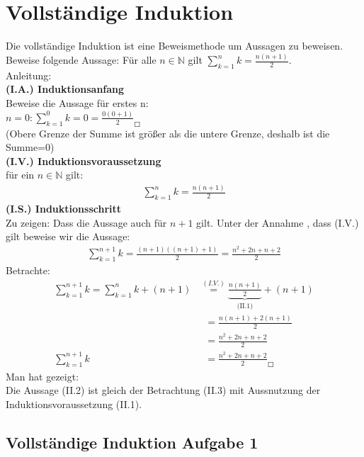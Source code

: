 \section{Vollständige Induktion}

Die vollständige Induktion ist eine Beweismethode um Aussagen zu beweisen.\\
Beweise folgende Aussage: Für alle $ n\in\mathbb{N} $ gilt $ \sum\limits_{k=1}^{n}k=\frac{n(n+1)}{2} $.\\
Anleitung:\\
\textbf{(I.A.) Induktionsanfang}\\
Beweise die Aussage für erstes n:\\
$ n=0:\sum\limits_{k=1}^{0}k=0=\frac{0(0+1)}{2}_{\Square} $\\
(Obere Grenze der Summe ist größer als die untere Grenze, deshalb ist die Summe=0)\\
\textbf{(I.V.) Induktionsvoraussetzung}\\
für ein $ n\in \mathbb{N} $ gilt:\\
\begin{align}
	\sum\limits_{k=1}^{n}k=\frac{n(n+1)}{2}
\end{align}
\textbf{(I.S.) Induktionsschritt}\\
Zu zeigen: Dass die Aussage auch für $ n+1 $ gilt. Unter der Annahme , dass (I.V.) gilt beweise wir die Aussage:\\
\begin{align}
	\sum\limits_{k=1}^{n+1}k=\frac{(n+1)((n+1)+1)}{2}=\frac{n^2+2n+n+2}{2}
\end{align}
Betrachte:\\
\begin{align}
	\sum\limits_{k=1}^{n+1}k=\sum\limits_{k=1}^{n}k+(n+1)&\overset{(I.V.)}{=}\underbrace{\frac{n(n+1)}{2}}_{\text{(II.1)}}+(n+1)\nonumber\\
	&\;\;=\frac{n(n+1)+2(n+1)}{2}\nonumber\\
	&\;\;=\frac{n^2+2n+n+2}{2}\nonumber\\
	\sum\limits_{k=1}^{n+1}k&\;\;=\frac{n^2+2n+n+2}{2}_{\Square}
\end{align}
Man hat gezeigt:\\
Die Aussage (II.2) ist gleich der Betrachtung (II.3) mit Aussnutzung der Induktionsvoraussetzung (II.1).
\subsection{Vollständige Induktion Aufgabe 1}

